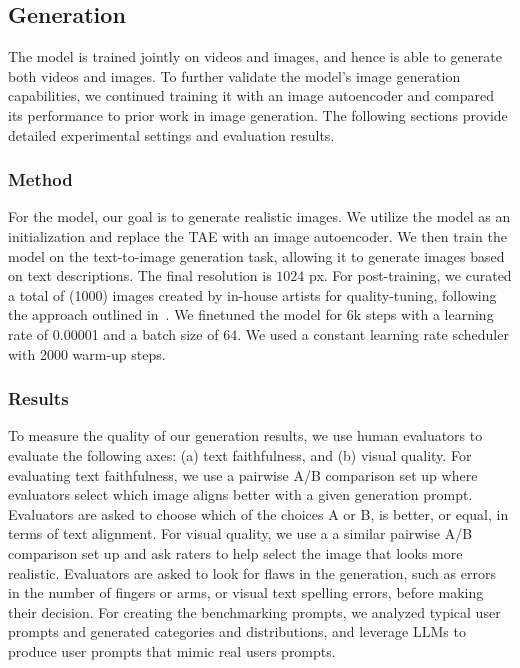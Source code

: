 \subsection{\TextToI Generation}
\label{sec:t2i_generation}
The \Ours model is trained jointly on videos and images, and hence is able to generate both videos and images.
To further validate the model's image generation capabilities, we continued training it with an image autoencoder and compared its performance to prior work in image generation.
The following sections provide detailed experimental settings and evaluation results.

\subsubsection{Method}
\label{sec:post_train_images}
For the \TextToI model, our goal is to generate realistic images. We utilize the \Ours model as an initialization and replace the TAE with an image autoencoder. We then train the model on the text-to-image generation task, allowing it to generate images based on text descriptions. The final resolution is $1024$ px.  For post-training, we curated a total of \bigO(1000) images created by in-house artists for quality-tuning, following the approach outlined in~\citep{dai2023emu}.
We finetuned the model for 6k steps with a learning rate of 0.00001 and a batch size of 64. We used a constant learning rate scheduler with 2000 warm-up steps.



\subsubsection{Results}

To measure the quality of our \TextToI generation results, we use human evaluators to evaluate the following axes: (a) text faithfulness, and (b) visual quality.
For evaluating text faithfulness, we use a pairwise A/B comparison set up where evaluators select which image aligns better with a given generation prompt.
Evaluators are asked to choose which of the choices A or B, is better, or equal, in terms of text alignment.
For visual quality, we use a a similar pairwise A/B comparison set up and ask raters to help select the image that looks more realistic.
Evaluators are asked to look for flaws in the generation, such as errors in the number of fingers or arms, or visual text spelling errors, before making their decision.
For creating the benchmarking prompts, we analyzed typical \textToI user prompts and generated categories and distributions, and leverage LLMs to produce user prompts that mimic real users prompts.



